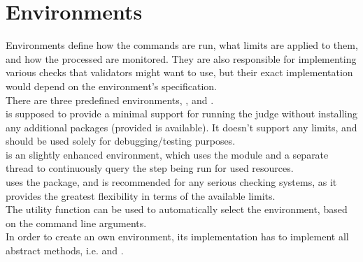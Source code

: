 \section{Environments}\label{sec:environments}
    Environments define how the commands are run, what limits are applied to them, and how the processed are monitored.
    They are also responsible for implementing various checks that validators might want to use, but their exact
    implementation would depend on the environment's specification.\\

    There are three predefined environments, \hyperref[sec:LocalComputer]{},
    \hyperref[sec:PsutilEnvironment]{} and
    \hyperref[sec:KolejkaObserver]{}.\\

    \hyperref[sec:LocalComputer]{} is supposed to provide a minimal support for running the judge
    without installing any additional packages (provided  is available).
    It doesn't support any limits, and should be used solely for debugging/testing purposes.\\

    \hyperref[sec:PsutilEnvironment]{} is an slightly enhanced environment, which uses the
     module and a separate thread to continuously query the step being run for used resources.\\

    \hyperref[sec:KolejkaObserver]{} uses the  package, and is
    recommended for any serious checking systems, as it provides the greatest flexibility in terms of the available
    limits.\\

    The utility function \hyperref[sec:detect_environment]{} can be used to
    automatically select the environment, based on the command line arguments.\\

    In order to create an own environment, its implementation has to implement all abstract methods, i.e.
    \hyperref[sec:run_command]{} and
    \hyperref[sec:format_execution_status]{}.\\

\subsection*{}

